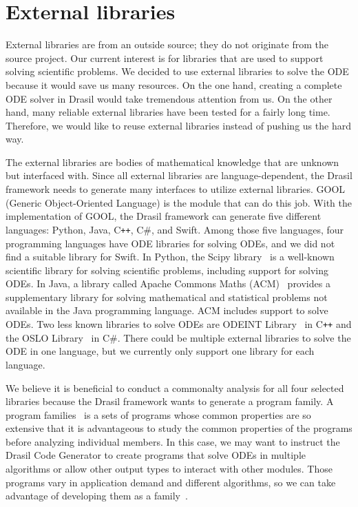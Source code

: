 \chapter{External libraries}
\label{cha_extlib}
External libraries are from an outside source; they do not originate from the source project. Our current interest is for libraries that are used to support solving scientific problems. We decided to use external libraries to solve the ODE because it would save us many resources. On the one hand, creating a complete ODE solver in Drasil would take tremendous attention from us. On the other hand, many reliable external libraries have been tested for a fairly long time. Therefore, we would like to reuse external libraries instead of pushing us the hard way. 

The external libraries are bodies of mathematical knowledge that are unknown but interfaced with. Since all external libraries are language-dependent, the Drasil framework needs to generate many interfaces to utilize external libraries. GOOL (Generic Object-Oriented Language) is the module that can do this job. With the implementation of GOOL, the Drasil framework can generate five different languages: Python, Java, C\texttt{++}, C\#, and Swift. Among those five languages, four programming languages have ODE libraries for solving ODEs, and we did not find a suitable library for Swift. In Python, the Scipy library~\citep{scipy} is a well-known scientific library for solving scientific problems, including support for solving ODEs. In Java, a library called Apache Commons Maths (ACM)~\citep{apache} provides a supplementary library for solving mathematical and statistical problems not available in the Java programming language. ACM includes support to solve ODEs. Two less known libraries to solve ODEs are ODEINT Library~\citep{odeint} in C\texttt{++} and the OSLO Library~\citep{oslo} in C\#. There could be multiple external libraries to solve the ODE in one language, but we currently only support one library for each language.

We believe it is beneficial to conduct a commonalty analysis for all four selected libraries because the Drasil framework wants to generate a program family. A program families~\citep{dp1976} is a sets of programs whose common properties are so extensive that it is advantageous to study the common properties of the programs before analyzing individual members. In this case, we may want to instruct the Drasil Code Generator to create programs that solve ODEs in multiple algorithms or allow other output types to interact with other modules. Those programs vary in application demand and different algorithms, so we can take advantage of developing them as a family~\citep{ss2004}.

